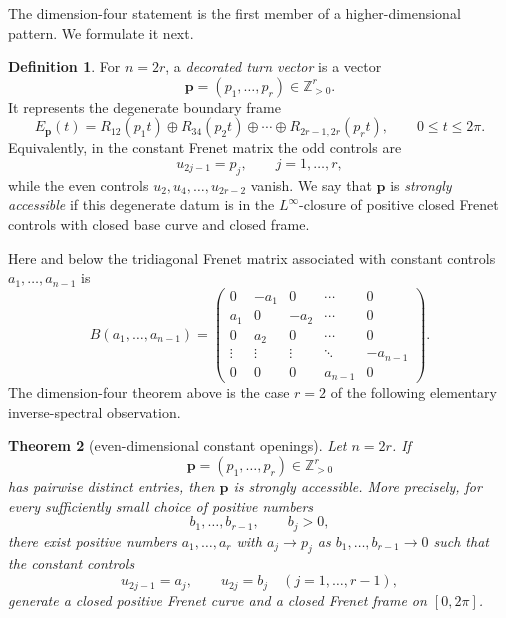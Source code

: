 \documentclass[11pt,reqno]{amsart}
\newtheorem{theorem}{Theorem}[section]
\theoremstyle{definition}
\newtheorem{definition}[theorem]{Definition}
\theoremstyle{remark}
\begin{document}
The dimension-four statement is the first member of a higher-dimensional pattern.
We formulate it next.

\begin{definition}
For $n=2r$, a \emph{decorated turn vector} is a vector
\[
        \mathbf p=(p_1,\ldots,p_r)\in\mathbb Z_{>0}^r .
\]
It represents the degenerate boundary frame
\begin{equation}\label{eq:even-decorated-frame}
        E_{\mathbf p}(t)=R_{12}(p_1t)\oplus R_{34}(p_2t)\oplus\cdots\oplus
        R_{2r-1,2r}(p_rt),\qquad 0\le t\le2\pi .
\end{equation}
Equivalently, in the constant Frenet matrix the odd controls are
\[
        u_{2j-1}=p_j,
        \qquad j=1,\ldots,r,
\]
while the even controls $u_2,u_4,\ldots,u_{2r-2}$ vanish.  We say that $\mathbf p$
is \emph{strongly accessible} if this degenerate datum is in the $L^\infty$-closure
of positive closed Frenet controls with closed base curve and closed frame.
\end{definition}

Here and below the tridiagonal Frenet matrix associated with constant controls
$a_1,\ldots,a_{n-1}$ is
\begin{equation}\label{eq:general-tridiagonal-B}
        B(a_1,\ldots,a_{n-1})=
        \begin{pmatrix}
        0&-a_1&0&\cdots&0\\
        a_1&0&-a_2&\cdots&0\\
        0&a_2&0&\cdots&0\\
        \vdots&\vdots&\vdots&\ddots&-a_{n-1}\\
        0&0&0&a_{n-1}&0
        \end{pmatrix}.
\end{equation}
The dimension-four theorem above is the case $r=2$ of the following elementary
inverse-spectral observation.

\begin{theorem}[even-dimensional constant openings]\label{thm:even-constant-openings}
Let $n=2r$.  If
\[
        \mathbf p=(p_1,\ldots,p_r)\in\mathbb Z_{>0}^r
\]
has pairwise distinct entries, then $\mathbf p$ is strongly accessible.  More
precisely, for every sufficiently small choice of positive numbers
\[
        b_1,\ldots,b_{r-1},\qquad b_j>0,
\]
there exist positive numbers $a_1,\ldots,a_r$ with $a_j\to p_j$ as
$b_1,\ldots,b_{r-1}\to0$ such that the constant controls
\begin{equation}\label{eq:even-opening-controls}
        u_{2j-1}=a_j,
        \qquad
        u_{2j}=b_j
        \quad (j=1,\ldots,r-1),
\end{equation}
generate a closed positive Frenet curve and a closed Frenet frame on $[0,2\pi]$.
\end{theorem}
\end{document}

